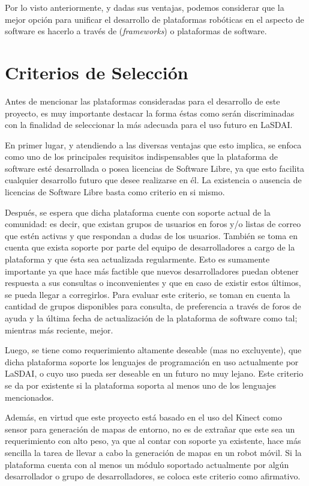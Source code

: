 Por lo visto anteriormente, y dadas sus ventajas, podemos considerar que la mejor opción para unificar el desarrollo de plataformas robóticas en el aspecto de software es hacerlo a través de (\textit{frameworks}) o plataformas de software.

\section{Criterios de Selección}

Antes de mencionar las plataformas consideradas para el desarrollo de este proyecto, es muy importante destacar la forma éstas como serán discriminadas con la finalidad de seleccionar la más adecuada para el uso futuro en LaSDAI.

En primer lugar, y atendiendo a las diversas ventajas que esto implica, se enfoca como uno de los principales requisitos indispensables que la plataforma de software esté desarrollada o posea licencias de Software Libre, ya que esto facilita cualquier desarrollo futuro que desee realizarse en él. La existencia o ausencia de licencias de Software Libre basta como criterio en si mismo.

Después, se espera que dicha plataforma cuente con soporte actual de la comunidad: es decir, que existan grupos de usuarios en foros y/o listas de correo que estén activas y que respondan a dudas de los usuarios. También se toma en cuenta que exista soporte por parte del equipo de desarrolladores a cargo de la plataforma y que ésta sea actualizada regularmente. Esto es sumamente importante ya que hace más factible que nuevos desarrolladores puedan obtener respuesta a sus consultas o inconvenientes y que en caso de existir estos últimos, se pueda llegar a corregirlos. Para evaluar este criterio, se toman en cuenta la cantidad de grupos disponibles para consulta, de preferencia a través de foros de ayuda y la última fecha de actualización de la plataforma de software como tal; mientras más reciente, mejor.

Luego, se tiene como requerimiento altamente deseable (mas no excluyente), que dicha plataforma soporte los lenguajes de programación en uso actualmente por LaSDAI, o cuyo uso pueda ser deseable en un futuro no muy lejano. Este criterio se da por existente si la plataforma soporta al menos uno de los lenguajes mencionados.

Además, en virtud que este proyecto está basado en el uso del Kinect como sensor para generación de mapas de entorno, no es de extrañar que este sea un requerimiento con alto peso, ya que al contar con soporte ya existente, hace más sencilla la tarea de llevar a cabo la generación de mapas en un robot móvil. Si la plataforma cuenta con al menos un módulo soportado actualmente por algún desarrollador o grupo de desarrolladores, se coloca este criterio como afirmativo.

